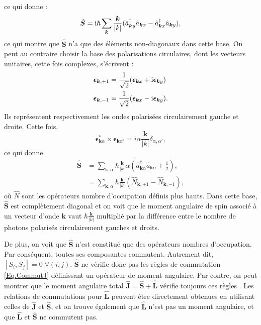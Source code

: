 ce qui donne : 
\begin{equation}
\hat{\bm{S}} = \mathrm{i}\hbar\sum_{\bm{k}}\frac{\bm{k}}{|k|}(\hat{a}^{\dag}_{\bm{k}y}\hat{a}_{\bm{k}x}-\hat{a}^{\dag}_{\bm{k}x}\hat{a}_{\bm{k}y}),
\end{equation}
ce qui montre que $\hat{\bm{S}}$ n'a que des éléments non-diagonaux dans cette base. On peut au contraire choisir la base des polarisations circulaires, dont les vecteurs unitaires, cette fois complexes, s'écrivent :
\begin{align}
\bm{\epsilon}_{\bm{k},+1} &= \frac{1}{\sqrt{2}}(\bm{\epsilon}_{\bm{k}x}+\mathrm{i}\bm{\epsilon}_{\bm{k}y})\\
\bm{\epsilon}_{\bm{k},-1} &= \frac{1}{\sqrt{2}}(\bm{\epsilon}_{\bm{k}x}-\mathrm{i}\bm{\epsilon}_{\bm{k}y}).
\end{align}
Ils représentent respectivement les ondes polarisées circulairement gauche et droite. Cette fois,
\begin{equation}
\bm{\epsilon}^*_{\bm{k}\alpha}\times\bm{\epsilon}_{\bm{k}\alpha '} = i\alpha\frac{\bm{k}}{|k|}\delta_{\alpha,\alpha'},
\end{equation}
ce qui donne 
\begin{align}
\hat{\bm{S}} &=\sum_{\bm{k},\alpha}\hbar\frac{\bm{k}}{|k|}\alpha(\hat{a}^{\dag}_{\bm{k}\alpha}\hat{a}_{\bm{k}\alpha}+\frac{1}{2}),\nonumber\\
&= \sum_{\bm{k},\alpha}\hbar\frac{\bm{k}}{|k|}(\hat{N}_{\bm{k},+1}-\hat{N}_{\bm{k},-1}),
\end{align}
où $\hat{N}$ sont les opérateurs nombre d'occupation définis plus hauts. Dans cette base, $\hat{\bm{S}}$ est complètement diagonal et on voit que le moment angulaire de spin associé à un vecteur d'onde $\bm{k}$ vaut $\hbar\frac{\bm{k}}{|k|}$ multiplié par la différence entre le nombre de photons polarisés circulairement gauches et droits.

De plus, on voit que $\hat{\bm{S}}$ n'est constitué que des opérateurs nombres d'occupation. Par conséquent, toutes ses composantes commutent. Autrement dit, $[S_i,S_j] = 0 \;\forall(i,j)$. $\hat{\bm{S}}$ ne vérifie donc pas les règles de commutation \ref{Eq.CommutJ} définissant un opérateur de moment angulaire. Par contre, on peut montrer que le moment angulaire total $\hat{\bm{J}} = \hat{\bm{S}}+\hat{\bm{L}}$ vérifie toujours ces règles . Les relations de commutations pour $\hat{\bm{L}}$ peuvent être directement obtenues en utilisant celles de $\hat{\bm{J}}$ et $\hat{\bm{S}}$, et on trouve également que $\hat{\bm{L}}$ n'est pas un moment angulaire, et que $\hat{\bm{L}}$ et $\hat{\bm{S}}$ ne commutent pas. 

